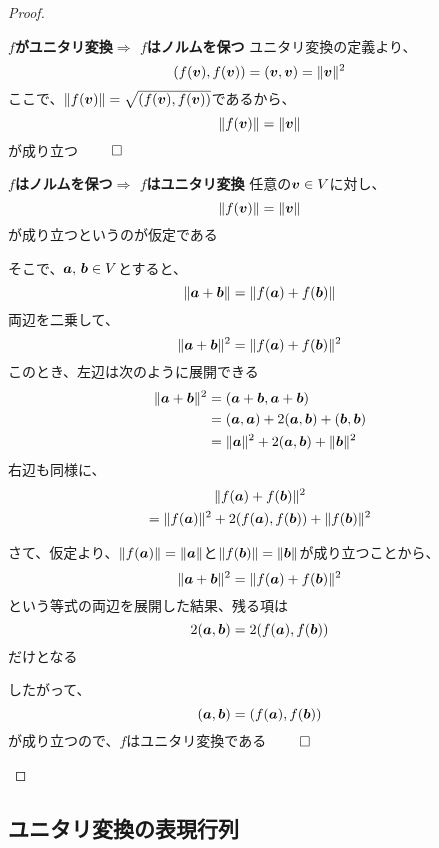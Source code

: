 \documentclass[../../../topic_linear-algebra]{subfiles}
\begin{document}
\begin{proof}
  \begin{subpattern}{\bfseries $f$がユニタリ変換$\Longrightarrow$ $f$はノルムを保つ}
    ユニタリ変換の定義より、
    \begin{equation*}
      (f(\vb*{v}),f(\vb*{v})) = (\vb*{v},\vb*{v}) = \|\vb*{v}\|^2
    \end{equation*}
    ここで、$\|f(\vb*{v})\| = \sqrt{(f(\vb*{v}),f(\vb*{v}))}$であるから、
    \begin{equation*}
      \|f(\vb*{v})\| = \|\vb*{v}\|
    \end{equation*}
    が成り立つ $\qed$
  \end{subpattern}

  \begin{subpattern}{\bfseries $f$はノルムを保つ$\Longrightarrow$ $f$はユニタリ変換}
    任意の$\vb*{v} \in V$に対し、
    \begin{equation*}
      \|f(\vb*{v})\| = \|\vb*{v}\|
    \end{equation*}
    が成り立つというのが仮定である

    そこで、$\vb*{a},\,\vb*{b} \in V$とすると、
    \begin{equation*}
      \|\vb*{a} + \vb*{b} \| = \|f(\vb*{a}) + f(\vb*{b})\|
    \end{equation*}
    両辺を二乗して、
    \begin{equation*}
      \|\vb*{a} + \vb*{b} \|^2 = \|f(\vb*{a}) + f(\vb*{b})\|^2
    \end{equation*}
    このとき、左辺は次のように展開できる
    \begin{align*}
      \|\vb*{a} + \vb*{b} \|^2 & = (\vb*{a} + \vb*{b},\vb*{a} + \vb*{b})                      \\
                               & = (\vb*{a},\vb*{a}) + 2(\vb*{a},\vb*{b}) + (\vb*{b},\vb*{b}) \\
                               & = \|\vb*{a}\|^2 + 2(\vb*{a},\vb*{b}) + \|\vb*{b}\|^2
    \end{align*}
    右辺も同様に、
    \begin{multline*}
      \|f(\vb*{a}) + f(\vb*{b})\|^2 \\= \|f(\vb*{a})\|^2 + 2(f(\vb*{a}),f(\vb*{b})) + \|f(\vb*{b})\|^2
    \end{multline*}

    さて、仮定より、$\|f(\vb*{a})\| = \|\vb*{a}\|$と$\|f(\vb*{b})\| = \|\vb*{b}\|$が成り立つことから、
    \begin{equation*}
      \|\vb*{a} + \vb*{b} \|^2 = \|f(\vb*{a}) + f(\vb*{b})\|^2
    \end{equation*}
    という等式の両辺を展開した結果、残る項は
    \begin{equation*}
      2 (\vb*{a},\vb*{b}) = 2(f(\vb*{a}),f(\vb*{b}))
    \end{equation*}
    だけとなる

    したがって、
    \begin{equation*}
      (\vb*{a},\vb*{b}) = (f(\vb*{a}),f(\vb*{b}))
    \end{equation*}
    が成り立つので、$f$はユニタリ変換である $\qed$
  \end{subpattern}
\end{proof}

\subsection{ユニタリ変換の表現行列}

\end{document}
